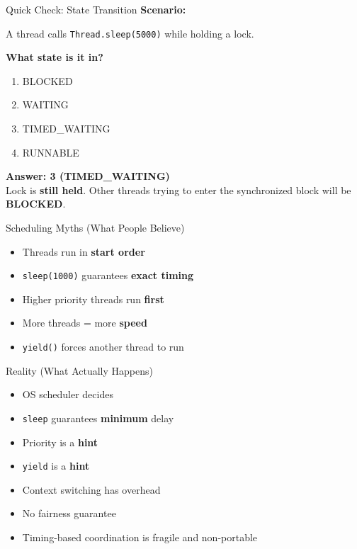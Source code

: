 \documentclass[aspectratio=169,11pt]{beamer}
\begin{document}
	\begin{frame}{Quick Check: State Transition}
		\textbf{Scenario:}
		\vspace{1mm}
		
		A thread calls \texttt{Thread.sleep(5000)} while holding a lock.
		
		\vspace{3mm}
		\textbf{What state is it in?}
		\begin{enumerate}
			\item BLOCKED
			\item WAITING
			\item TIMED\_WAITING
			\item RUNNABLE
		\end{enumerate}

		\textbf{Answer: 3 (TIMED\_WAITING)}\\
		\footnotesize Lock is \textbf{still held}. Other threads trying to enter the synchronized block will be \textbf{BLOCKED}.
	\end{frame}
	
	
	\begin{frame}{Scheduling Myths (What People Believe)}
		\begin{itemize}
			\item Threads run in \textbf{start order}
			\item \texttt{sleep(1000)} guarantees \textbf{exact timing}
			\item Higher priority threads run \textbf{first}
			\item More threads = more \textbf{speed}
			\item \texttt{yield()} forces another thread to run
		\end{itemize}
	\end{frame}
	
	\begin{frame}{Reality (What Actually Happens)}
		\begin{itemize}
			\item OS scheduler decides
			\item \texttt{sleep} guarantees \textbf{minimum} delay
			\item Priority is a \textbf{hint}
			\item \texttt{yield} is a \textbf{hint}
			\item Context switching has overhead
			\item No fairness guarantee
			\item Timing-based coordination is fragile and non-portable
		\end{itemize}
	\end{frame}
	
\end{document}
